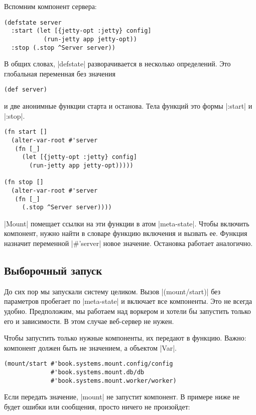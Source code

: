 Вспомним компонент сервера:

\begin{verbatim}
(defstate server
  :start (let [{jetty-opt :jetty} config]
           (run-jetty app jetty-opt))
  :stop (.stop ^Server server))
\end{verbatim}

В общих словах, \spverb|defstate| разворачивается в несколько определений. Это
глобальная переменная без значения

\begin{verbatim}
(def server)
\end{verbatim}

\noindent
и две анонимные функции старта и останова. Тела функций это формы
\spverb|:start| и \spverb|:stop|.

\begin{verbatim}
(fn start []
  (alter-var-root #'server
   (fn [_]
     (let [{jetty-opt :jetty} config]
       (run-jetty app jetty-opt)))))

(fn stop []
  (alter-var-root #'server
   (fn [_]
     (.stop ^Server server))))
\end{verbatim}

\spverb|Mount| помещает ссылки на эти функции в атом \spverb|meta-state|. Чтобы
включить компонент, нужно найти в словаре функцию включения и вызвать
ее. Функция назначит переменной \spverb|#'server| новое значение. Остановка
работает аналогично.

\subsection{Выборочный запуск}

До сих пор мы запускали систему целиком. Вызов \spverb|(mount/start)| без
параметров пробегает по \spverb|meta-state| и включает все компоненты. Это не
всегда удобно. Предположим, мы работаем над воркером и хотели бы запустить
только его и зависимости. В этом случае веб-сервер не нужен.

Чтобы запустить только нужные компоненты, их передают в функцию. Важно:
компонент должен быть не значением, а объектом \spverb|Var|.

\begin{verbatim}
(mount/start #'book.systems.mount.config/config
             #'book.systems.mount.db/db
             #'book.systems.mount.worker/worker)
\end{verbatim}

Если передать значение, \spverb|mount| не запустит компонент. В примере ниже не
будет ошибки или сообщения, просто ничего не произойдет:

